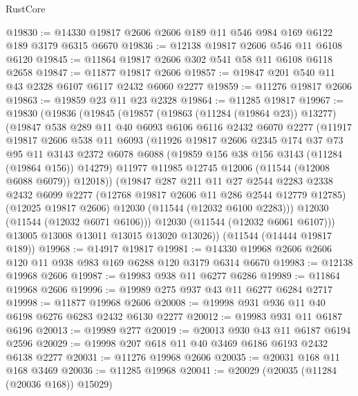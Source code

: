 \begin{lexlean}{RustCore}
\begin{coremodule}
@19830 := @14330 @19817 @2606 @2606 @189 @11 @546 @984 @169 @6122 @189 @3179 @6315 @6670
@19836 := @12138 @19817 @2606 @546 @11 @6108 @6120
@19845 := @11864 @19817 @2606 @302 @541 @58 @11 @6108 @6118 @2658
@19847 := @11877 @19817 @2606
@19857 := @19847 @201 @540 @11 @43 @2328 @6107 @6117 @2432 @6060 @2277
@19859 := @11276 @19817 @2606
@19863 := @19859 @23 @11 @23 @2328
@19864 := @11285 @19817
@19967 := @19830
    (@19836
      (@19845
        (@19857
          (@19863 (@11284 (@19864 @23)) @13277)
          (@19847
            @538
            @289
            @11
            @40
            @6093
            @6106
            @6116
            @2432
            @6070
            @2277
            (@11917
              @19817
              @2606
              @538
              @11
              @6093
              (@11926
                @19817
                @2606
                @2345
                @174
                @37
                @73
                @95
                @11
                @3143
                @2372
                @6078
                @6088
                (@19859 @156 @38 @156 @3143 (@11284 (@19864 @156)) @14279)
                @11977
                @11985
                @12745
                @12006
                (@11544 (@12008 @6088 @6079))
                @12018))
            (@19847
              @287
              @211
              @11
              @27
              @2544
              @2283
              @2338
              @2432
              @6099
              @2277
              (@12768 @19817 @2606 @11 @286 @2544 @12779 @12785)
              (@12025 @19817 @2606)
              @12030
              (@11544 (@12032 @6100 @2283)))
            @12030
            (@11544 (@12032 @6071 @6106)))
          @12030
          (@11544 (@12032 @6061 @6107)))
        @13005
        @13008
        @13011
        @13015
        @13020
        @13026))
    (@11544 (@14444 @19817 @189))
@19968 := @14917 @19817
@19981 := @14330 @19968 @2606 @2606 @120 @11 @938 @983 @169 @6288 @120 @3179 @6314 @6670
@19983 := @12138 @19968 @2606
@19987 := @19983 @938 @11 @6277 @6286
@19989 := @11864 @19968 @2606
@19996 := @19989 @275 @937 @43 @11 @6277 @6284 @2717
@19998 := @11877 @19968 @2606
@20008 := @19998 @931 @936 @11 @40 @6198 @6276 @6283 @2432 @6130 @2277
@20012 := @19983 @931 @11 @6187 @6196
@20013 := @19989 @277
@20019 := @20013 @930 @43 @11 @6187 @6194 @2596
@20029 := @19998 @207 @618 @11 @40 @3469 @6186 @6193 @2432 @6138 @2277
@20031 := @11276 @19968 @2606
@20035 := @20031 @168 @11 @168 @3469
@20036 := @11285 @19968
@20041 := @20029 (@20035 (@11284 (@20036 @168)) @15029)

\end{coremodule}
\end{lexlean}
